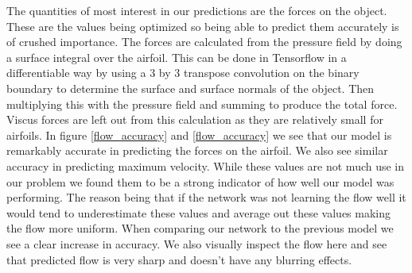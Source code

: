 \documentclass{article} %
\begin{document}
The quantities of most interest in our predictions are the forces on the object. These are the values being optimized so being able to predict them accurately is of crushed importance. The forces are calculated from the pressure field by doing a surface integral over the airfoil. This can be done in Tensorflow in a differentiable way by using a 3 by 3 transpose convolution on the binary boundary to determine the surface and surface normals of the object. Then multiplying this with the pressure field and summing to produce the total force. Viscus forces are left out from this calculation as they are relatively small for airfoils. In figure \ref{flow_accuracy} and \ref{flow_accuracy} we see that our model is remarkably accurate in predicting the forces on the airfoil. We also see similar accuracy in predicting maximum velocity. While these values are not much use in our problem we found them to be a strong indicator of how well our model was performing. The reason being that if the network was not learning the flow well it would tend to underestimate these values and average out these values making the flow more uniform. When comparing our network to the previous model we see a clear increase in accuracy. We also visually inspect the flow here and see that predicted flow is very sharp and doesn't have any blurring effects.
\end{document}
